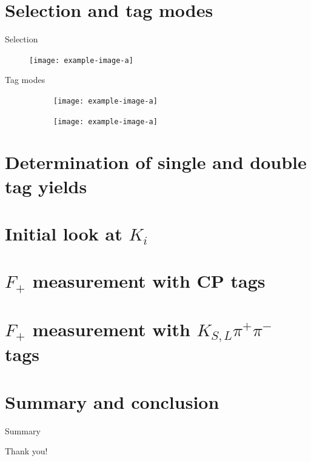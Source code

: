 \documentclass{beamer}
\begin{document}
\section{Selection and tag modes}
\begin{frame}{Selection}
  \begin{figure}
    \centering
    \texttt{[image: example-image-a]}
  \end{figure}
\end{frame}

\begin{frame}{Tag modes}
  \begin{figure}
    \centering
    \begin{subfigure}{0.5\textwidth}
      \centering
      \texttt{[image: example-image-a]}
    \end{subfigure}%
    \begin{subfigure}{0.5\textwidth}
      \centering
      \texttt{[image: example-image-a]}
    \end{subfigure}
  \end{figure}
\end{frame}

\section{Determination of single and double tag yields}

\section{Initial look at \texorpdfstring{$K_i$}{Ki}}

\section{\texorpdfstring{$F_+$}{F+} measurement with CP tags}

\section{\texorpdfstring{$F_+$}{F+} measurement with \texorpdfstring{$K_{S, L}\pi^+\pi^-$}{KSpipi} tags}

\section{Summary and conclusion}

\begin{frame}{Summary}
  \begin{center}
    {\huge Thank you!}
  \end{center}
\end{frame}
    
\end{document}
